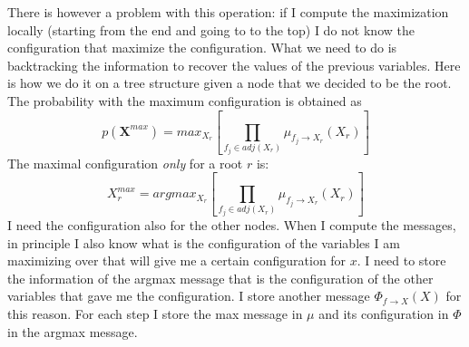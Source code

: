         There is however a problem with this operation: if I compute the maximization locally (starting from the end and going to to the top) I do not know the configuration that maximize the configuration. 
        What we need to do is backtracking the information to recover the values of the previous variables. Here is how we do it on a tree structure given a node that we decided to be the root.\\
        The probability with the maximum configuration is obtained as
        $$p(\textbf{X}^{max}) = max_{X_r} \left[ \prod_{f_j \in adj(X_r)} \mu_{f_j \rightarrow X_r}  (X_r) \right] $$
        The maximal configuration \textit{only} for a root $r$ is:
        $$X_r^{max} = argmax_{X_r} \left[ \prod_{f_j \in adj(X_r)}  \mu_{f_j \rightarrow X_r}  (X_r) \right] $$
        I need the configuration also for the other nodes. When I compute the messages, in principle I also know what is the configuration of the variables I am maximizing over that will give me a certain configuration for $x$. 
        I need to store the information of the argmax message that is the configuration of the other variables that gave me the configuration. I store another message $\Phi_{f\rightarrow X} (X)$ for this reason. For each step I store the max message in $\mu$ and its configuration in $\Phi$ in the argmax message.
